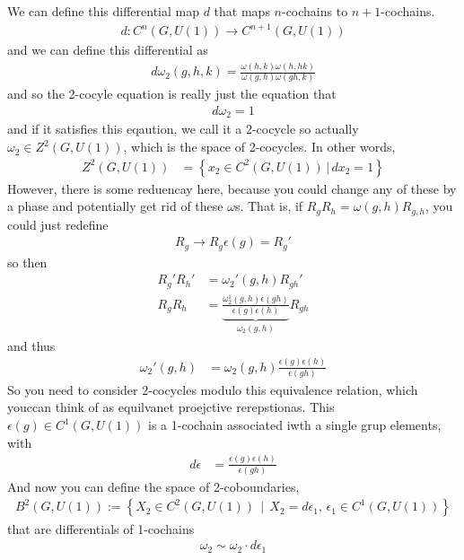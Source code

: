 We can define this differential map $d$ that maps $n$-cochains to
$n+1$-cochains.
\begin{align}
    d: C^n(G, U(1)) \to C^{n+1}(G, U(1))
\end{align}
and we can define this differential as
\begin{align}
    d\omega_2 (g, h, k)
    =
    \frac{\omega(h, k) \omega(h, hk)}{\omega(g, h) \omega(gh, k)}
\end{align}
and so the 2-cocyle equation is really just the equation that
\begin{align}
    d\omega_2 = 1
\end{align}
and if it satisfies this eqaution,
we call it a 2-cocycle
so actually
$\omega_2 \in Z^2(G, U(1))$,
which is the space of 2-cocycles.
In other words,
\begin{align}
    Z^2(G, U(1)) &=
    \left\{
    x_2 \in C^2(G, U(1)) \,|\,
    dx_2 = 1
    \right\}
\end{align}
However,
there is some reduencay here,
because you could change any of these by a phase and potentially get rid of
these $\omega$s.
That is,
if $R_g R_h = \omega(g, h) R_{g,h}$,
you could just redefine
\begin{align}
    R_g \to R_g \epsilon(g) = R_g'
\end{align}
so then
\begin{align}
    R_g' R_h' &= \omega_2'(g, h) R_{gh}'\\
    R_g R_h &=
    \underbrace{\frac{\omega_2^1(g, h) \epsilon(gh)}{\epsilon(g)
    \epsilon(h)}}_{\omega_2(g, h)} R_{gh}
\end{align}
and thus
\begin{align}
    \omega_2'(g,h) &=
    \omega_2(g, h) \frac{\epsilon(g) \epsilon(h)}{\epsilon(gh)}
\end{align}
So you need to consider 2-cocycles modulo this equivalence relation,
which youccan think of as equilvanet proejctive rerepstionas.
This $\epsilon(g)\in C^1(G, U(1))$ is a 1-cochain associated iwth a single grup
elements,
with
\begin{align}
    d\epsilon &=
    \frac{\epsilon(g) \epsilon(h)}{\epsilon(gh)}
\end{align}
And now you can define the space of 2-coboundaries,
\begin{align}
    B^2(G, U(1)) := \left\{ 
    X_2 \in C^2(G, U(1)) \, \mid\,
    X_2 = d\epsilon_1,\,
    \epsilon_1 \in C^1(G, U(1))
    \right\}
\end{align}
that are differentials of 1-cochains
\begin{align}
    \omega_2 \sim \omega_2 \cdot d\epsilon_1
\end{align}

